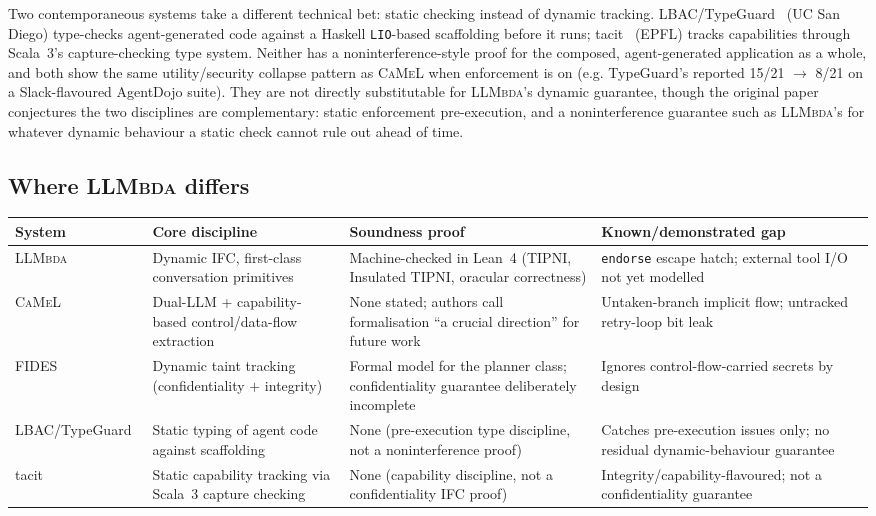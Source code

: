 \documentclass[11pt, a4paper]{article}
\newcommand{\LLMbda}{\textsc{LLMbda}\xspace}
\newcommand{\CaMeL}{\textsc{CaMeL}\xspace}
\newcommand{\FIDES}{\textsc{FIDES}\xspace}
\begin{document}
Two contemporaneous systems take a different technical bet: static
checking instead of dynamic tracking. LBAC/TypeGuard~\cite{lbac} (UC San
Diego) type-checks agent-generated code against a Haskell
\texttt{LIO}-based scaffolding before it runs; tacit~\cite{tacit} (EPFL)
tracks capabilities through Scala~3's capture-checking type system.
Neither has a noninterference-style proof for the composed,
agent-generated application as a whole, and both show the same
utility/security collapse pattern as \CaMeL when enforcement is on (e.g.
TypeGuard's reported 15/21 $\rightarrow$ 8/21 on a Slack-flavoured
AgentDojo suite). They are not directly substitutable for  \LLMbda's
dynamic guarantee, though the original paper conjectures the two
disciplines are complementary: static enforcement pre-execution, and a
noninterference guarantee such as  \LLMbda's for whatever dynamic
behaviour a static check cannot rule out ahead of time.

\subsection{Where  \LLMbda differs}

\small
\begin{tabular}{@{}p{2.2cm}p{3.8cm}p{3.8cm}p{4.7cm}@{}}
\toprule
System & Core discipline & Soundness proof & Known/demonstrated gap \\
\midrule
 \LLMbda & Dynamic IFC, first-class conversation primitives &
Machine-checked in Lean~4 (TIPNI, Insulated TIPNI, oracular
correctness) & \lstinline{endorse} escape hatch; external tool I/O not
yet modelled \\
\CaMeL~\cite{camel} & Dual-LLM + capability-based control/data-flow
extraction & None stated; authors call formalisation ``a crucial
direction'' for future work & Untaken-branch implicit flow;
untracked retry-loop bit leak \\
\FIDES~\cite{fides} & Dynamic taint tracking (confidentiality $+$
integrity) & Formal model for the planner class; confidentiality
guarantee deliberately incomplete & Ignores control-flow-carried
secrets by design \\
LBAC/\allowbreak TypeGuard~\cite{lbac} & Static typing of agent code against
scaffolding & None (pre-execution type discipline, not a
noninterference proof) & Catches pre-execution issues only; no
residual dynamic-behaviour guarantee \\
tacit~\cite{tacit} & Static capability tracking via Scala~3 capture
checking & None (capability discipline, not a confidentiality IFC
proof) & Integrity/capability-flavoured; not a confidentiality
guarantee \\
\bottomrule
\end{tabular}
\end{document}
